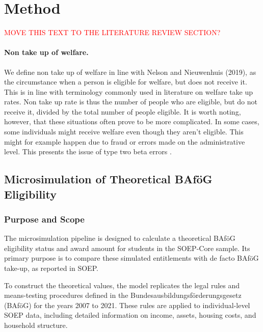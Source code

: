 \section{Method} 

\textcolor{red}{MOVE THIS TEXT TO THE LITERATURE REVIEW SECTION?}

\paragraph{Non take up of welfare.}

We define non take up of welfare in line with Nelson and Nieuwenhuis (2019), as the circumstance when a person is eligible for welfare, but does not receive it. This is in line with terminology commonly used in literature on welfare take up rates. Non take up rate is thus the number of people who are eligible, but do not receive it, divided by the total number of people eligible. It is worth noting, however, that these situations often prove to be more complicated. In some cases, some individuals might receive welfare even though they aren’t eligible. This might for example happen due to fraud or errors made on the administrative level. This presents the issue of type two beta errors \citep{herber_non-take-up_2019, nelson_towards_2021}.


\subsection{Microsimulation of Theoretical BAföG Eligibility} 
\subsubsection{Purpose and Scope}
The microsimulation pipeline is designed to calculate a theoretical BAföG eligibility status and award amount for students in the SOEP-Core sample. 
Its primary purpose is to compare these simulated entitlements with de facto BAföG take-up, as reported in SOEP.

To construct the theoretical values, the model replicates the legal rules and means-testing procedures defined in the Bundesausbildungsförderungsgesetz (BAföG) for the years 2007 to 2021. 
These rules are applied to individual-level SOEP data, including detailed information on income, assets, housing costs, and household structure.

